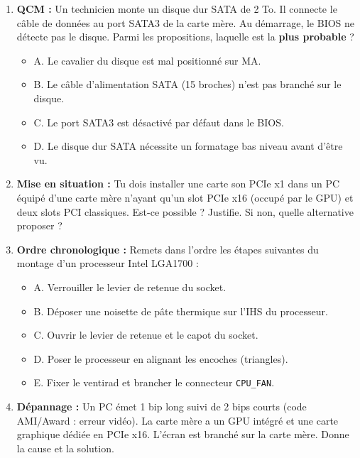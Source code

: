 \documentclass[11pt]{article}
\begin{document}
\begin{exercice}
\begin{enumerate}
\item \textbf{QCM :} Un technicien monte un disque dur SATA de 2 To. Il connecte le câble de données au port SATA3 de la carte mère. Au démarrage, le BIOS ne détecte pas le disque. Parmi les propositions, laquelle est la \textbf{plus probable} ?
\begin{itemize}
\item A. Le cavalier du disque est mal positionné sur MA.
\item B. Le câble d'alimentation SATA (15 broches) n'est pas branché sur le disque.
\item C. Le port SATA3 est désactivé par défaut dans le BIOS.
\item D. Le disque dur SATA nécessite un formatage bas niveau avant d'être vu.
\end{itemize}
\item \textbf{Mise en situation :} Tu dois installer une carte son PCIe x1 dans un PC équipé d'une carte mère n'ayant qu'un slot PCIe x16 (occupé par le GPU) et deux slots PCI classiques. Est-ce possible ? Justifie. Si non, quelle alternative proposer ?
\item \textbf{Ordre chronologique :} Remets dans l'ordre les étapes suivantes du montage d'un processeur Intel LGA1700 :
\begin{itemize}
\item A. Verrouiller le levier de retenue du socket.
\item B. Déposer une noisette de pâte thermique sur l'IHS du processeur.
\item C. Ouvrir le levier de retenue et le capot du socket.
\item D. Poser le processeur en alignant les encoches (triangles).
\item E. Fixer le ventirad et brancher le connecteur \texttt{CPU\_FAN}.
\end{itemize}
\item \textbf{Dépannage :} Un PC émet 1 bip long suivi de 2 bips courts (code AMI/Award : erreur vidéo). La carte mère a un GPU intégré et une carte graphique dédiée en PCIe x16. L'écran est branché sur la carte mère. Donne la cause et la solution.
\end{enumerate}
\end{exercice}
\end{document}
